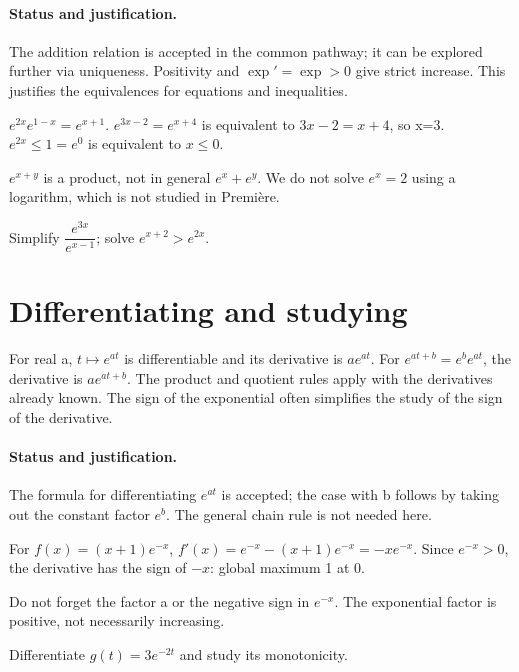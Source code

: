 \paragraph{Status and justification.} The addition relation is accepted in the common pathway; it can be explored further via uniqueness. Positivity and $\exp\prime=\exp>0$ give strict increase. This justifies the equivalences for equations and inequalities.
\begin{example}$e^{2x}e^{1-x}=e^{x+1}$. $e^{3x-2}=e^{x+4}$ is equivalent to $3x-2=x+4$, so x=3. $e^{2x}\leq1=e^0$ is equivalent to $x\leq0$.\end{example}\label{C09-EX2}
\begin{pitfall}$e^{x+y}$ is a product, not in general $e^x+e^y$. We do not solve $e^x=2$ using a logarithm, which is not studied in Première.\end{pitfall}
\begin{application}Simplify $\dfrac{e^{3x}}{e^{x-1}}$; solve $e^{x+2}>e^{2x}$.\end{application}\label{C09-AP2}
\section{Differentiating and studying}\label{C09-U3}
\begin{keypoint}
For real a, $t\mapsto e^{at}$ is differentiable and its derivative is $ae^{at}$. For $e^{at+b}=e^be^{at}$, the derivative is $ae^{at+b}$. The product and quotient rules apply with the derivatives already known. The sign of the exponential often simplifies the study of the sign of the derivative.
\end{keypoint}
\paragraph{Status and justification.} The formula for differentiating $e^{at}$ is accepted; the case with b follows by taking out the constant factor $e^b$. The general chain rule is not needed here.
\begin{example}For $f(x)=(x+1)e^{-x}$, $f\prime(x)=e^{-x}-(x+1)e^{-x}=-xe^{-x}$. Since $e^{-x}>0$, the derivative has the sign of $-x$: global maximum 1 at 0.\end{example}\label{C09-EX3}
\begin{pitfall}Do not forget the factor a or the negative sign in $e^{-x}$. The exponential factor is positive, not necessarily increasing.\end{pitfall}
\begin{application}Differentiate $g(t)=3e^{-2t}$ and study its monotonicity.\end{application}\label{C09-AP3}
